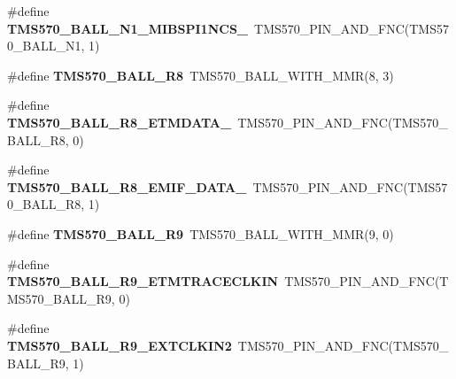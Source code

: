 \begin{DoxyCompactItemize}
\item 
\mbox{\label{tms570ls3137zwt-pins_8h_a9cc286d6054a6761e9281e9d32cda26e}} 
\#define {\bfseries T\+M\+S570\+\_\+\+B\+A\+L\+L\+\_\+\+N1\+\_\+\+M\+I\+B\+S\+P\+I1\+N\+C\+S\+\_}~T\+M\+S570\+\_\+\+P\+I\+N\+\_\+\+A\+N\+D\+\_\+\+F\+NC(T\+M\+S570\+\_\+\+B\+A\+L\+L\+\_\+\+N1, 1)
\item 
\mbox{\label{tms570ls3137zwt-pins_8h_af89fd36ad39810b845eccab488fe8699}} 
\#define {\bfseries T\+M\+S570\+\_\+\+B\+A\+L\+L\+\_\+\+R8}~T\+M\+S570\+\_\+\+B\+A\+L\+L\+\_\+\+W\+I\+T\+H\+\_\+\+M\+MR(8, 3)
\item 
\mbox{\label{tms570ls3137zwt-pins_8h_a6cf81ddba73737e6b5257129aa238acd}} 
\#define {\bfseries T\+M\+S570\+\_\+\+B\+A\+L\+L\+\_\+\+R8\+\_\+\+E\+T\+M\+D\+A\+T\+A\+\_}~T\+M\+S570\+\_\+\+P\+I\+N\+\_\+\+A\+N\+D\+\_\+\+F\+NC(T\+M\+S570\+\_\+\+B\+A\+L\+L\+\_\+\+R8, 0)
\item 
\mbox{\label{tms570ls3137zwt-pins_8h_a5e50970fe4fe9cb7492eb487532340b7}} 
\#define {\bfseries T\+M\+S570\+\_\+\+B\+A\+L\+L\+\_\+\+R8\+\_\+\+E\+M\+I\+F\+\_\+\+D\+A\+T\+A\+\_}~T\+M\+S570\+\_\+\+P\+I\+N\+\_\+\+A\+N\+D\+\_\+\+F\+NC(T\+M\+S570\+\_\+\+B\+A\+L\+L\+\_\+\+R8, 1)
\item 
\mbox{\label{tms570ls3137zwt-pins_8h_a3fa67adba184c7376db9796b4915efb8}} 
\#define {\bfseries T\+M\+S570\+\_\+\+B\+A\+L\+L\+\_\+\+R9}~T\+M\+S570\+\_\+\+B\+A\+L\+L\+\_\+\+W\+I\+T\+H\+\_\+\+M\+MR(9, 0)
\item 
\mbox{\label{tms570ls3137zwt-pins_8h_a38d479c3712cd51fd1d89cb0463a3a05}} 
\#define {\bfseries T\+M\+S570\+\_\+\+B\+A\+L\+L\+\_\+\+R9\+\_\+\+E\+T\+M\+T\+R\+A\+C\+E\+C\+L\+K\+IN}~T\+M\+S570\+\_\+\+P\+I\+N\+\_\+\+A\+N\+D\+\_\+\+F\+NC(T\+M\+S570\+\_\+\+B\+A\+L\+L\+\_\+\+R9, 0)
\item 
\mbox{\label{tms570ls3137zwt-pins_8h_a8a304016db429b999e4f2548e0d8d57c}} 
\#define {\bfseries T\+M\+S570\+\_\+\+B\+A\+L\+L\+\_\+\+R9\+\_\+\+E\+X\+T\+C\+L\+K\+I\+N2}~T\+M\+S570\+\_\+\+P\+I\+N\+\_\+\+A\+N\+D\+\_\+\+F\+NC(T\+M\+S570\+\_\+\+B\+A\+L\+L\+\_\+\+R9, 1)
\item 

\end{DoxyCompactItemize}
